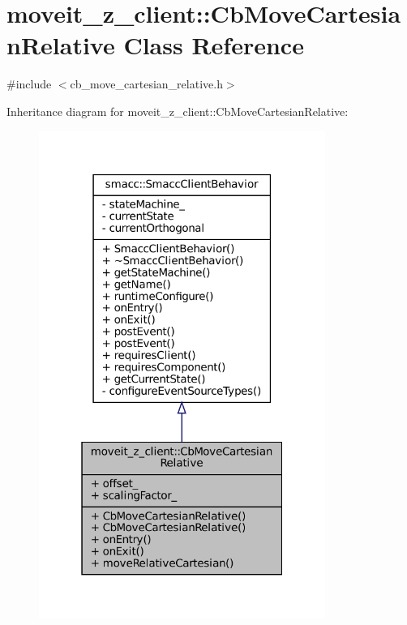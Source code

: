 \hypertarget{classmoveit__z__client_1_1CbMoveCartesianRelative}{}\section{moveit\+\_\+z\+\_\+client\+:\+:Cb\+Move\+Cartesian\+Relative Class Reference}
\label{classmoveit__z__client_1_1CbMoveCartesianRelative}


{\ttfamily \#include $<$cb\+\_\+move\+\_\+cartesian\+\_\+relative.\+h$>$}



Inheritance diagram for moveit\+\_\+z\+\_\+client\+:\+:Cb\+Move\+Cartesian\+Relative\+:
\nopagebreak
\begin{figure}[H]
\begin{center}
\leavevmode
\includegraphics[width=265pt]{classmoveit__z__client_1_1CbMoveCartesianRelative__inherit__graph}
\end{center}
\end{figure}


